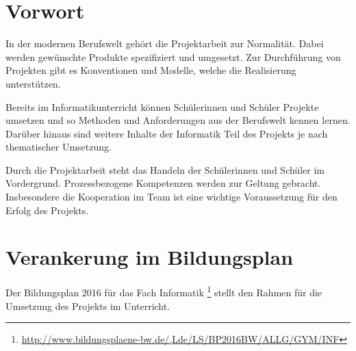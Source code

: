 \documentclass[a4paper,12pt]{article}
\newcommand{\sus}{Schülerinnen und Schüler}
\begin{document}
    \maketitle


\section{Vorwort}
    In der modernen Berufswelt gehört die Projektarbeit zur Normalität.
    Dabei werden gewünschte Produkte spezifiziert und umgesetzt.
    Zur Durchführung von Projekten gibt es Konventionen und Modelle, 
    welche die Realisierung unterstützen.
    
    Bereits im Informatikunterricht können \sus{} Projekte umsetzen
    und so Methoden und Anforderungen aus der Berufswelt kennen lernen.
    Darüber hinaus sind weitere Inhalte der Informatik Teil des Projekts 
    je nach thematischer Umsetzung.

    Durch die Projektarbeit steht das Handeln der \sus{} im Vordergrund.
    Prozessbezogene Kompetenzen werden zur Geltung gebracht.
    Insbesondere die Kooperation im Team ist eine wichtige Voraussetzung 
    für den Erfolg des Projekts.

\section{Verankerung im Bildungsplan}

    Der Bildungsplan 2016 für das Fach Informatik 
    \footnote{\url{http://www.bildungsplaene-bw.de/,Lde/LS/BP2016BW/ALLG/GYM/INF}}
    stellt den Rahmen für die Umsetzung des Projekts im Unterricht.
\end{document}

